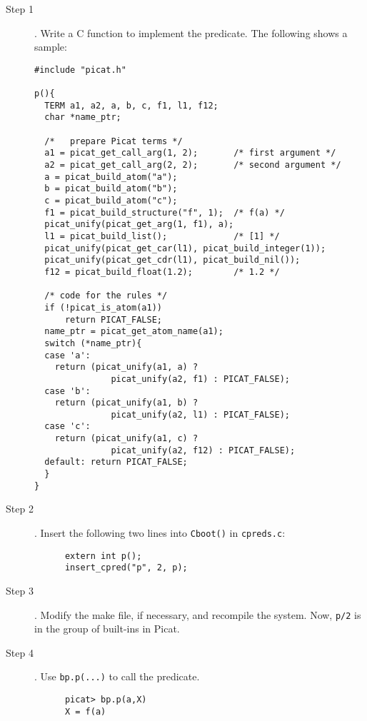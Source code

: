 \begin{description}
\item [Step 1]. Write a C function to implement the predicate. The following shows a sample:
\begin{verbatim}
#include "picat.h"

p(){
  TERM a1, a2, a, b, c, f1, l1, f12;
  char *name_ptr;
  
  /*   prepare Picat terms */
  a1 = picat_get_call_arg(1, 2);       /* first argument */
  a2 = picat_get_call_arg(2, 2);       /* second argument */
  a = picat_build_atom("a");
  b = picat_build_atom("b");
  c = picat_build_atom("c");
  f1 = picat_build_structure("f", 1);  /* f(a) */
  picat_unify(picat_get_arg(1, f1), a);
  l1 = picat_build_list();             /* [1] */ 
  picat_unify(picat_get_car(l1), picat_build_integer(1));
  picat_unify(picat_get_cdr(l1), picat_build_nil());
  f12 = picat_build_float(1.2);        /* 1.2 */
  
  /* code for the rules */
  if (!picat_is_atom(a1)) 
      return PICAT_FALSE;
  name_ptr = picat_get_atom_name(a1);
  switch (*name_ptr){
  case 'a': 
    return (picat_unify(a1, a) ? 
               picat_unify(a2, f1) : PICAT_FALSE);
  case 'b': 
    return (picat_unify(a1, b) ? 
               picat_unify(a2, l1) : PICAT_FALSE);
  case 'c': 
    return (picat_unify(a1, c) ? 
               picat_unify(a2, f12) : PICAT_FALSE);
  default: return PICAT_FALSE;
  }
}
\end{verbatim}

\item [Step 2]. Insert the following two lines into \texttt{Cboot()} in \texttt{cpreds.c}:
\begin{verbatim}
      extern int p();
      insert_cpred("p", 2, p);
\end{verbatim}
\item [Step 3]. Modify the make file, if necessary, and recompile the system. Now, \texttt{p/2} is in the group of built-ins in Picat.

\item [Step 4]. Use \texttt{bp.p(...)} to call the predicate.
\begin{verbatim}
      picat> bp.p(a,X)
      X = f(a)
\end{verbatim}

\end{description}

